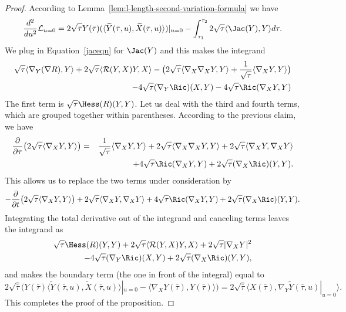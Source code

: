 \begin{proof}
According to Lemma~\ref{lem:l-length-second-variation-formula} we have
$$\frac{d^2}{du^2}{\mathcal L}_{u=0}=2\sqrt{\bar
\tau}Y(\bar\tau)(\langle \widetilde Y(\bar\tau,u),\widetilde
X(\bar\tau,u)\rangle)|_{u=0}-\int_{\tau_1}^{\tau_2}2\sqrt{\tau}\langle
\Jac(Y),Y\rangle d\tau.$$ We plug in
Equation~\ref{jaceqn} for $\Jac(Y)$ and this makes the
integrand
\begin{eqnarray*}\sqrt{\tau}\langle\nabla_Y(\nabla
R),Y\rangle+2\sqrt{\tau}\langle{\mathcal R}(Y,X)Y,X\rangle
-\bigl(2\sqrt{\tau}\langle\nabla_X\nabla_XY,Y\rangle+\frac{1}{\sqrt{\tau}}\langle\nabla_XY,Y\rangle\bigr)\\
-4\sqrt{\tau}(\nabla_Y\Ric)(X,Y)-4\sqrt{\tau}\Ric(\nabla_XY,Y)
\end{eqnarray*}
The first term is $\sqrt{\tau}\Hess(R)(Y,Y)$. Let us deal with
the third and fourth terms, which are grouped together within
parentheses. According to the previous claim, we have
\begin{eqnarray*}
\frac{\partial}{\partial \tau}\bigl(2\sqrt{\tau}\langle
\nabla_XY,Y\rangle\bigr) & = &
\frac{1}{\sqrt{\tau}}\langle\nabla_XY,Y\rangle+2\sqrt{\tau}\langle\nabla_X\nabla_XY,Y\rangle
 +2\sqrt{\tau}\langle\nabla_XY,\nabla_XY\rangle \\ & & +4\sqrt{\tau}\Ric(\nabla_XY,Y)
 +2\sqrt{\tau} (\nabla_X\Ric)(Y,Y).
\end{eqnarray*}
This allows us to replace the two terms under consideration by
$$-\frac{\partial}{\partial t}\bigl(2\sqrt{\tau}\langle
\nabla_XY,Y\rangle\bigr)+2\sqrt{\tau}\langle\nabla_XY,\nabla_XY\rangle+4\sqrt{\tau}\Ric(\nabla_XY,Y) +2\sqrt{\tau} (\nabla_X\Ric)(Y,Y).$$
Integrating the total derivative out of the integrand  and canceling
terms leaves the integrand as
\begin{eqnarray*}\sqrt{\tau}\Hess(R)(Y,Y)+2\sqrt{\tau}\langle{\mathcal R}(Y,X)Y,X\rangle
+2\sqrt{\tau}|\nabla_XY|^2 \\
-4\sqrt{\tau}(\nabla_Y\Ric)(X,Y)+2\sqrt{\tau} (\nabla_X\Ric)(Y,Y),
\end{eqnarray*}
and makes the boundary term (the one in front of the integral) equal
to
$$2\sqrt{\bar\tau}\bigl(Y(\bar\tau)\langle
\widetilde Y(\bar\tau,u),\widetilde
X(\bar\tau,u)\rangle|_{u=0}-\langle
\nabla_XY(\bar\tau),Y(\bar\tau)\rangle\bigr)=2\sqrt{\bar\tau}\langle
X(\bar\tau),\nabla_Y\widetilde Y(\bar\tau,u)|_{u=0}\rangle.$$ This
completes the proof of the proposition.
\end{proof}








